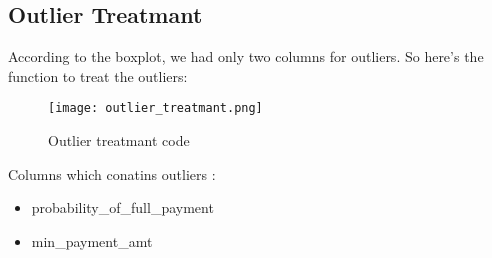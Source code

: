 \documentclass[12pt]{article}
\begin{document}
\subsection{Outlier Treatmant}

According to the boxplot, we had only two columns for outliers. So here's the function to treat the outliers:


\begin{figure}[h]
    \centering
    \texttt{[image: outlier\_treatmant.png]}
    \caption{Outlier treatmant code}
    \label{fig:example}
\end{figure}

Columns which conatins outliers :

\begin{itemize}
    \item probability\_of\_full\_payment
    \item min\_payment\_amt
\end{itemize}
\end{document}
